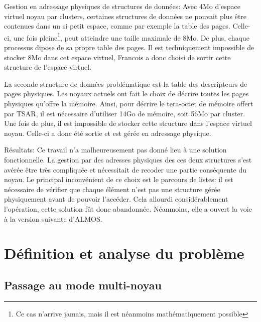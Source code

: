       \begin{paragraph}{Gestion en adressage physiques de structures de données:}
        Avec 4Mo d'espace virtuel noyau par clusters, certaines structures de
        données ne pouvait plus être contenues dans un si petit espace, comme
        par exemple la table des pages. Celle-ci, une fois pleine\footnote{Ce
          cas n'arrive jamais, mais il est néanmoins mathématiquement possible},
        peut atteindre une taille maximale de 8Mo. De plus, chaque processus
        dipose de sa propre table des pages. Il est techniquement impossible de
        stocker 8Mo dans cet espace virtuel, Francois a donc choisi de sortir
        cette structure de l'espace virtuel.

        La seconde structure de données problématique est la table des
        descripteurs de pages physiques. Les noyaux actuels ont fait le choix de
        décrire toutes les pages physiques qu'offre la mémoire. Ainsi, pour
        décrire le tera-octet de mémoire offert par TSAR, il est nécessaire
        d'utiliser 14Go de mémoire, soit 56Mo par cluster. Une fois de plus, il
        est impossible de stocker cette structure dans l'espace virtuel
        noyau. Celle-ci a donc été sortie et est gérée en adressage physique.
      \end{paragraph}

      \begin{paragraph}{Résultats:}
        Ce travail n'a malheureusement pas donné lieu à une solution
        fonctionnelle. La gestion par des adresses physiques des ces deux
        structures s'est avérée être très compliquée et nécessitait de recoder
        une partie conséquente du noyau. Le principal inconvénient de ce choix
        est le parcours de listes: il est nécessaire de vérifier que chaque
        élément n'est pas une structure gérée physiquement avant de pouvoir
        l'accéder. Cela allourdi considérablement l'opération, cette solution
        fût donc abandonnée. Néanmoins, elle a ouvert la voie à la version
        suivante d'ALMOS.
      \end{paragraph}


  \section{Définition et analyse du problème}      

    \subsection{Passage au mode multi-noyau}
    \label{sec:multi-noyau}

